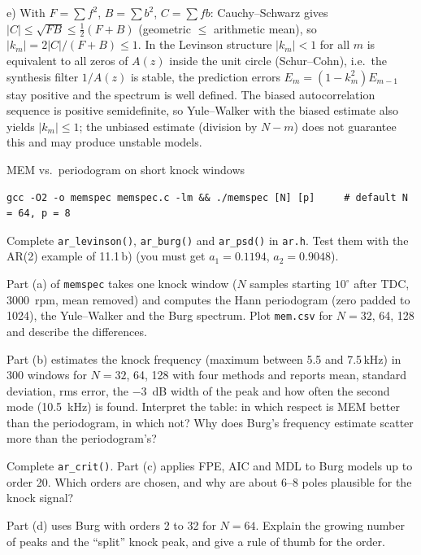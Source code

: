 \begin{solution}
e) With $F=\sum f^2$, $B=\sum b^2$, $C=\sum fb$: Cauchy--Schwarz gives
$|C|\le\sqrt{FB}\le\tfrac12(F+B)$ (geometric $\le$ arithmetic mean), so
$|k_m|=2|C|/(F+B)\le1$. In the Levinson structure $|k_m|<1$ for all $m$ is equivalent
to all zeros of $A(z)$ inside the unit circle (Schur--Cohn), i.e.\ the synthesis filter
$1/A(z)$ is stable, the prediction errors $E_m=(1-k_m^2)E_{m-1}$ stay positive and
the spectrum is well defined. The biased autocorrelation sequence is positive
semidefinite, so Yule--Walker with the biased estimate also yields $|k_m|\le1$; the
unbiased estimate (division by $N-m$) does not guarantee this and may produce
unstable models.
\end{solution}

\begin{exercise}{MEM vs.\ periodogram on short knock windows}{\JSLinux}
\sloppy
\begin{lstlisting}[style=shell]
gcc -O2 -o memspec memspec.c -lm && ./memspec [N] [p]     # default N = 64, p = 8
\end{lstlisting}
\begin{tasks}
  \item Complete \texttt{ar\_levinson()}, \texttt{ar\_burg()} and \texttt{ar\_psd()}
    in \texttt{ar.h}. Test them with the AR(2) example of 11.1\,b) (you must get
    $a_1=0.1194$, $a_2=0.9048$).
  \item Part (a) of \texttt{memspec} takes one knock window ($N$ samples starting
    $10^\circ$ after TDC, \SI{3000}{rpm}, mean removed) and computes the Hann
    periodogram (zero padded to 1024), the Yule--Walker and the Burg spectrum.
    Plot \texttt{mem.csv} for $N=32$, 64, 128 and describe the differences.
  \item Part (b) estimates the knock frequency (maximum between 5.5 and 7.5\,kHz)
    in 300 windows for $N=32$, 64, 128 with four methods and reports mean,
    standard deviation, rms error, the \SI{-3}{dB} width of the peak and how often
    the second mode (\SI{10.5}{kHz}) is found. Interpret the table: in which
    respect is MEM better than the periodogram, in which not? Why does Burg's
    frequency estimate scatter more than the periodogram's?
  \item Complete \texttt{ar\_crit()}. Part (c) applies FPE, AIC and MDL to Burg models
    up to order 20. Which orders are chosen, and why are about 6--8 poles plausible
    for the knock signal?
  \item Part (d) uses Burg with orders 2 to 32 for $N=64$. Explain the growing number
    of peaks and the ``split'' knock peak, and give a rule of thumb for the order.
\end{tasks}
\end{exercise}

